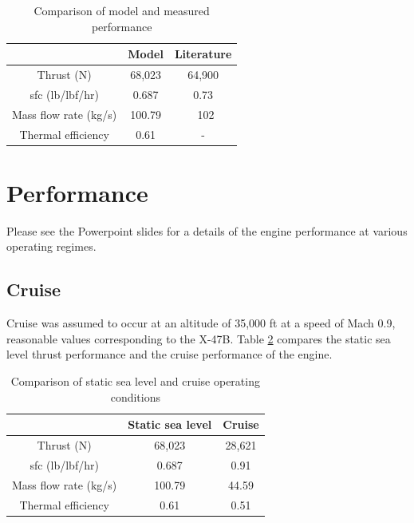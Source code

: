 \documentclass{article}
\begin{document}
\begin{table}
\caption{Comparison of model and measured performance}
\label{tab:comparison}
\begin{center}
\begin{tabular}{c | c | c}
& \textbf{Model} & \textbf{Literature} \\ \hline
Thrust (N) & 68,023 & 64,900 \\
sfc (lb/lbf/hr) & 0.687 & 0.73 \\
Mass flow rate (kg/s) & 100.79 & ~102 \\
Thermal efficiency & 0.61 & - \\
\end{tabular}
\end{center}
\end{table}

\section{Performance}

Please see the Powerpoint slides for a details of the engine performance at various operating regimes.

\subsection{Cruise}

Cruise was assumed to occur at an altitude of 35,000 ft at a speed of Mach 0.9, reasonable values corresponding to the X-47B. Table \ref{tab:compare_SLS_and_cruise} compares the static sea level thrust performance and the cruise performance of the engine.

\begin{table}
\caption{Comparison of static sea level and cruise operating conditions}
\label{tab:compare_SLS_and_cruise}
\begin{center}
\begin{tabular}{c | c | c}
& \textbf{Static sea level} & \textbf{Cruise} \\ \hline
Thrust (N) & 68,023 & 28,621 \\
sfc (lb/lbf/hr) & 0.687 & 0.91 \\
Mass flow rate (kg/s) & 100.79 & 44.59 \\
Thermal efficiency & 0.61 & 0.51 \\
\end{tabular}
\end{center}
\end{table}
\end{document}
